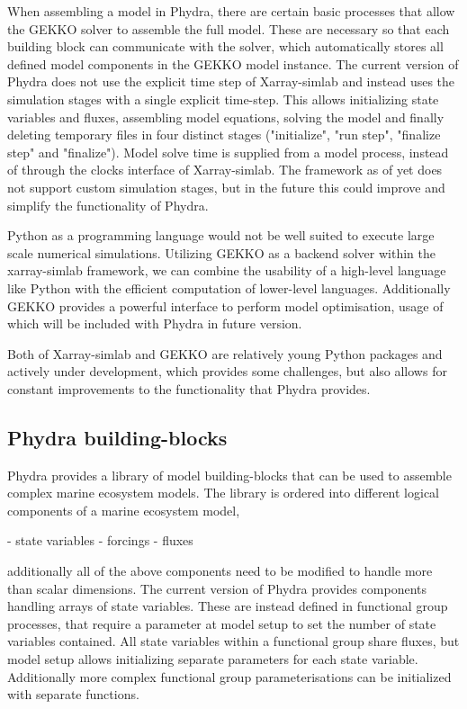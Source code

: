 \documentclass[journal abbreviations, manuscript]{copernicus}
\begin{document}
When assembling a model in Phydra, there are certain basic processes that allow the GEKKO solver to assemble the full model. These are necessary so that each building block can communicate with the solver, which automatically stores all defined model components in the GEKKO model instance. The current version of Phydra does not use the explicit time step of Xarray-simlab and instead uses the simulation stages with a single explicit time-step. This allows initializing state variables and fluxes, assembling model equations, solving the model and finally deleting temporary files in four distinct stages ("initialize", "run step", "finalize step" and "finalize"). Model solve time is supplied from a model process, instead of through the clocks interface of Xarray-simlab. The framework as of yet does not support custom simulation stages, but in the future this could improve and simplify the functionality of Phydra.

Python as a programming language would not be well suited to execute large scale numerical simulations.
Utilizing GEKKO as a backend solver within the xarray-simlab framework, we can combine the usability of a high-level language like Python with the efficient computation of lower-level languages. Additionally GEKKO provides a powerful interface to perform model optimisation, usage of which will be included with Phydra in future version. 

Both of Xarray-simlab and GEKKO are relatively young  Python packages and actively under development, which provides some challenges, but also allows for constant improvements to the functionality that Phydra provides.


\subsection{Phydra building-blocks}

Phydra provides a library of model building-blocks that can be used to assemble complex marine ecosystem models. The library is ordered into different logical components of a marine ecosystem model, 

- state variables
- forcings
- fluxes

additionally all of the above components need to be modified to handle more than scalar dimensions.
The current version of Phydra provides components handling arrays of state variables. These are instead defined in functional group processes, that require a parameter at model setup to set the number of state variables contained. All state variables within a functional group share fluxes, but model setup allows initializing separate parameters for each state variable. Additionally more complex functional group parameterisations can be initialized with separate functions.
\end{document}
